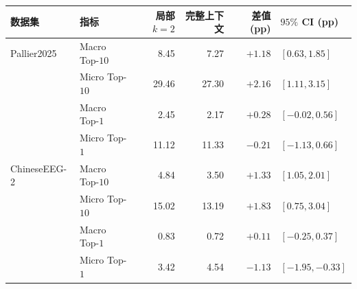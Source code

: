 \begingroup
\papertablestyle
\begin{tabular}{@{}llrrrl@{}}
\toprule
数据集 & 指标 & 局部 $k=2$ & 完整上下文 & 差值 (pp) & $95\%$ CI (pp) \\
\midrule
Pallier2025 & Macro Top-$10$ & 8.45 & 7.27 & $+1.18$ & $[0.63, 1.85]$ \\
 & Micro Top-$10$ & 29.46 & 27.30 & $+2.16$ & $[1.11, 3.15]$ \\
\addlinespace
 & Macro Top-$1$ & 2.45 & 2.17 & $+0.28$ & $[-0.02, 0.56]$ \\
 & Micro Top-$1$ & 11.12 & 11.33 & $-0.21$ & $[-1.13, 0.66]$ \\
\midrule
ChineseEEG-2 & Macro Top-$10$ & 4.84 & 3.50 & $+1.33$ & $[1.05, 2.01]$ \\
 & Micro Top-$10$ & 15.02 & 13.19 & $+1.83$ & $[0.75, 3.04]$ \\
\addlinespace
 & Macro Top-$1$ & 0.83 & 0.72 & $+0.11$ & $[-0.25, 0.37]$ \\
 & Micro Top-$1$ & 3.42 & 4.54 & $-1.13$ & $[-1.95, -0.33]$ \\
\bottomrule
\end{tabular}
\endgroup
